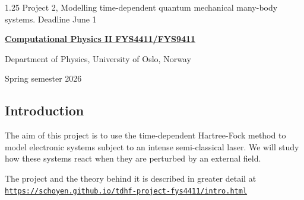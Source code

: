 \documentclass[%
oneside,                 %
final,                   %
10pt]{article}
\begin{document}

\newcommand{\exercisesection}[1]{\subsection*{#1}}






\thispagestyle{empty}

\begin{center}
{\LARGE\bf
\begin{spacing}{1.25}
Project 2, Modelling time-dependent quantum mechanical many-body systems. Deadline June 1
\end{spacing}
}
\end{center}


\begin{center}
{\bf \href{{http://www.uio.no/studier/emner/matnat/fys/FYS4411/index-eng.html}}{Computational Physics II FYS4411/FYS9411}}
\end{center}

    \begin{center}
\centerline{{\small Department of Physics, University of Oslo, Norway}}
\end{center}
    

\begin{center}
Spring semester 2026
\end{center}

\vspace{1cm}


\subsection{Introduction}

The aim of this project is to use the time-dependent Hartree-Fock method to
model electronic systems subject to an intense semi-classical laser. We will
study how these systems react when they are perturbed by an external field.

The project and the theory behind it is described in greater detail at \href{{https://schoyen.github.io/tdhf-project-fys4411/intro.html}}{\nolinkurl{https://schoyen.github.io/tdhf-project-fys4411/intro.html}}
\end{document}
